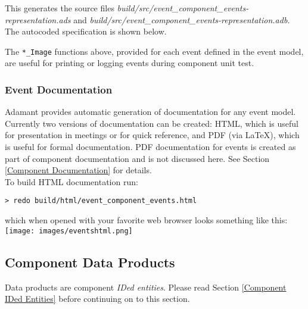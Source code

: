 This generates the source files \textit{build/src/event\_component\_events-representation.ads} and \textit{build/src/event\_component\_events-representation.adb}. The autocoded specification is shown below.


The \texttt{*\_Image} functions above, provided for each event defined in the event model, are useful for printing or logging events during component unit test.

\subsubsection{Event Documentation}

Adamant provides automatic generation of documentation for any event model. Currently two versions of documentation can be created: HTML, which is useful for presentation in meetings or for quick reference, and PDF (via \LaTeX), which is useful for formal documentation. PDF documentation for events is created as part of component documentation and is not discussed here. See Section \ref{Component Documentation} for details. \\

To build HTML documentation run:

\vspace{5mm} %
\begin{verbatim}
> redo build/html/event_component_events.html
\end{verbatim}
\vspace{5mm} %

which when opened with your favorite web browser looks something like this: \\

\vspace{5mm} %
\texttt{[image: images/eventshtml.png]}
\vspace{5mm} %

\subsection{Component Data Products}

Data products are component \textit{IDed entities}. Please read Section \ref{Component IDed Entities} before continuing on to this section. \\

